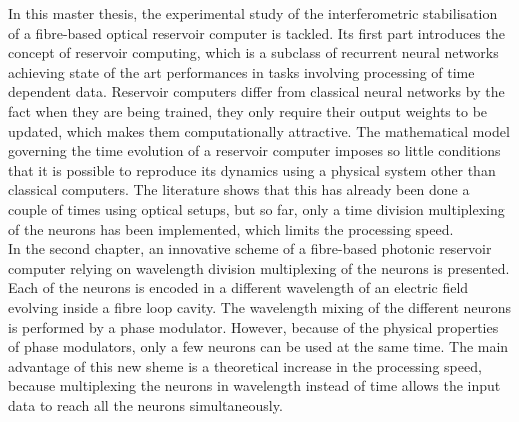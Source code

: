In this master thesis, the experimental study of the interferometric stabilisation of a fibre-based optical reservoir computer is tackled. Its first part introduces the concept of reservoir computing, which is a subclass of recurrent neural networks achieving state of the art performances in tasks involving processing of time dependent data. Reservoir computers differ from classical neural networks by the fact when they are being trained, they only require their output weights to be updated, which makes them computationally attractive. The mathematical model governing the time evolution of a reservoir computer imposes so little conditions that it is possible to reproduce its dynamics using a physical system other than classical computers. The literature shows that this has already been done a couple of times using optical setups, but so far, only a time division multiplexing of the neurons has been implemented, which limits the processing speed.\\

In the second chapter, an innovative scheme of a fibre-based photonic reservoir computer relying on wavelength division multiplexing of the neurons is presented. Each of the neurons is encoded in a different wavelength of an electric field evolving inside a fibre loop cavity. The wavelength mixing of the different neurons is performed by a phase modulator. However, because of the physical properties of phase modulators, only a few neurons can be used at the same time. The main advantage of this new sheme is a theoretical increase in the processing speed, because multiplexing the neurons in wavelength instead of time allows the input data to reach all the neurons simultaneously.\\


